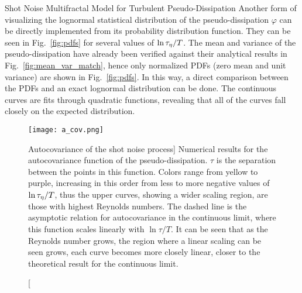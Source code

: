 \begin{chapter}{Shot Noise Multifractal Model for Turbulent Pseudo-Dissipation}
Another form of visualizing the lognormal statistical distribution of the pseudo-dissipation $\varphi$ can be directly implemented from its probability distribution function.
They can be seen in Fig.~\ref{fig:pdfs} for several values of $\ln\tau_{\eta}/T$.
The mean and variance of the pseudo-dissipation have already been verified against their analytical results in Fig.~\ref{fig:mean_var_match}, hence only normalized PDFs (zero mean and unit variance) are shown in Fig.~\ref{fig:pdfs}. In this way, a direct comparison between the PDFs and an exact lognormal distribution can be done. The continuous curves are fits through quadratic functions, revealing that all of the curves fall closely on the expected distribution.

\begin{figure}[ht]
    \centering
    \texttt{[image: a\_cov.png]}
    \caption
    [Autocovariance of the shot noise process]
    {Numerical results for the autocovariance function of the pseudo-dissipation. $\tau$ is the separation between the points in this function.
    Colors range from yellow to purple, increasing in this order from less to more negative values of $\ln\tau_{\eta}/T$, thus the upper curves, showing a wider scaling region, are those with highest Reynolds numbers.
    The dashed line is the asymptotic relation for autocovariance in the continuous limit, where this function scales linearly with $\ln\tau/T$.
    It can be seen that as the Reynolds number grows, the region where a linear scaling can be seen grows, each curve becomes more closely linear, closer to the theoretical result for the continuous limit.
    }
    \label{fig:cov}
\end{figure}


\end{chapter}
